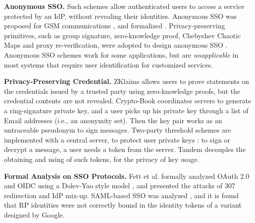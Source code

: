 \noindent\textbf{Anonymous SSO.}
Such schemes allow authenticated users to access a service protected by an IdP,
    without revealing their identities.
Anonymous SSO was proposed for GSM communications \cite{ElmuftiWRR08},
    and formalized \cite{WangWS13}.
Privacy-preserving primitives, such as group signature, zero-knowledge proof, Chebyshev Chaotic Maps and proxy re-verification,
     were adopted to design anonymous SSO \cite{WangWS13,HanCSTW18,Lee18,HanCSTWW20}.
Anonymous SSO schemes work for some applications,
    but are \emph{unapplicable} in most systems that require user identification for customized services.

\noindent\textbf{Privacy-Preserving Credential.}
ZKlaims \cite{zklaim} allows users to prove statements on the credentials issued by a trusted party
    using zero-knowledge proofs,
        but the credential contents are not revealed.
Crypto-Book \cite{crypto-book} coordinates servers to generate a ring-signature private key,
 and a user picks up his private key through a list of Email addresses (i.e., an anonymity set).
 Then the key pair works as an untraceable pseudonym to sign messages.
Two-party threshold schemes are implemented with a central server,
    to protect user private keys \cite{mRSA,ss-rsa}:
    to sign or decrypt a message, a user needs a token from the server.
    Tandem \cite{tandem} decouples the obtaining and using of such tokens,
for the privacy of key usage.


\noindent\textbf{Formal Analysis on SSO Protocols.}
Fett et al. \cite{FettKS16, FettKS17} formally analyzed OAuth 2.0 and OIDC using a Dolev-Yao style model \cite{FettKS14},
    and presented the attacks of 307 redirection and IdP mix-up.
SAML-based SSO was analyzed \cite{ArmandoCCCT08},
    and it is found that RP identities were not correctly bound in the identity tokens of a variant designed by Google.



